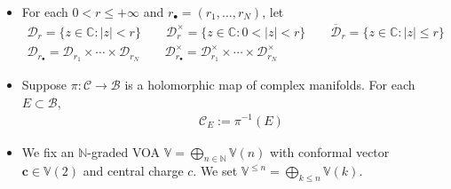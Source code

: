 \documentclass[11pt,b5paper,notitlepage]{article}
\theoremstyle{definition}
\theoremstyle{plain}
\newcommand{\mc}{\mathcal}
\newcommand{\ovl}{\overline}
\newcommand{\blt}{\bullet}
\newcommand{\Vbb}{\mathbb V}
\newcommand{\Cbb}{\mathbb C}
\newcommand{\Nbb}{\mathbb N}
\newcommand{\cbf}{\mathbf c}
\newcommand{\<}{\left\langle}
\renewcommand{\>}{\right\rangle}
\newcommand{\MC}{\mathcal{C}}
\newcommand{\MB}{\mathcal{B}}
\newcommand{\MD}{\mathcal{D}}
\numberwithin{equation}{subsection}
\begin{document}
\begin{itemize}
\item For each $0<r\leq+\infty$ and $r_\blt=(r_1,\dots,r_N)$, let
\begin{gather*}
\mc D_r=\{z\in\Cbb:|z|<r\}\qquad \mc D_r^\times=\{z\in\Cbb:0<|z|<r\}\qquad\ovl{\mc D}_r=\{z\in\Cbb:|z|\leq r\}\\
\MD_{r_\blt}=\MD_{r_1}\times\cdots\times\MD_{r_N}\qquad \MD^\times_{r_\blt}=\MD^\times_{r_1}\times\cdots\times\MD^\times_{r_N}
\end{gather*}


    \item Suppose $\pi:\MC\rightarrow \MB$ is a holomorphic map of complex manifolds. For each $E\subset\MB$, 
    \begin{align*}
 \quad \MC_E:=\pi^{-1}(E)
    \end{align*}


\item We fix an $\Nbb$-graded VOA $\Vbb=\bigoplus_{n\in\Nbb}\Vbb(n)$ with conformal vector $\cbf\in\Vbb(2)$  and central charge $c$. We set $\Vbb^{\leq n}=\bigoplus_{k\leq n}\Vbb(k)$. 


\end{itemize}
\end{document}
